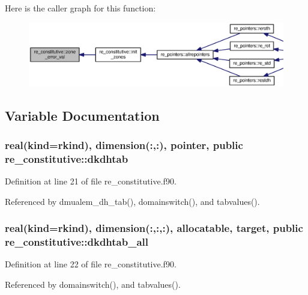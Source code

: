 Here is the caller graph for this function\+:\nopagebreak
\begin{figure}[H]
\begin{center}
\leavevmode
\includegraphics[width=350pt]{namespacere__constitutive_a6c717771e468878eec01e1aa2a27ba7a_icgraph}
\end{center}
\end{figure}




\subsection{Variable Documentation}
\subsubsection[{dkdhtab}]{\setlength{\rightskip}{0pt plus 5cm}real(kind=rkind), dimension(\+:,\+:), pointer, public re\+\_\+constitutive\+::dkdhtab}\label{namespacere__constitutive_a208992652d12a3b477dff42e9df5be7f}


Definition at line 21 of file re\+\_\+constitutive.\+f90.



Referenced by dmualem\+\_\+dh\+\_\+tab(), domainswitch(), and tabvalues().

\subsubsection[{dkdhtab\+\_\+all}]{\setlength{\rightskip}{0pt plus 5cm}real(kind=rkind), dimension(\+:,\+:,\+:), allocatable, target, public re\+\_\+constitutive\+::dkdhtab\+\_\+all}\label{namespacere__constitutive_aef95ec1b86499eb41011942a9cf53ce8}


Definition at line 22 of file re\+\_\+constitutive.\+f90.



Referenced by domainswitch(), and tabvalues().

